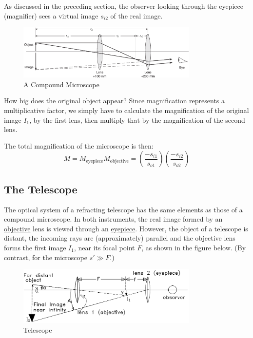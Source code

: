As discussed in the preceding section, the observer looking through the eyepiece (magnifier) sees a virtual image $s_{i2}$ of the real image.
\begin{figure}[h]
\centering
\includegraphics[width=0.8\textwidth]{./Exp7/pic/image9a.png}
\caption{A Compound Microscope}
\label{fig:micro1}
\end{figure}

How big does the original object appear? Since magnification represents a multiplicative factor, we simply have to calculate the magnification of the original image $I_1$, by the first lens, then multiply that by the magnification of the second lens. \myskip

The total magnification of the microscope is then:
\begin{equation}
	M=M_{\text{eyepiece}}M_{\text{objective}} =  \left(\frac{-s_{i1}}{s_{o1}}\right) \left(\frac{-s_{i2}}{s_{o2}}\right)
\end{equation}

\subsection{The Telescope}
\label{sec:telescope}
The optical system of a refracting telescope has the same elements as those of a compound microscope. In both instruments, the real image formed by an \underline{objective} lens is viewed through an \underline{eyepiece}. However, the object of a telescope is distant, the incoming rays are (approximately) parallel and the objective lens forms the first image $I_1$, near its focal point $F$, as shown in the figure below. (By contrast, for the microscope $s'\gg F$.)\myskip
\begin{figure}[h]
\centering
\includegraphics[width=0.8\textwidth]{./Exp7/pic/image4.png}
\caption{Telescope}
\end{figure}


